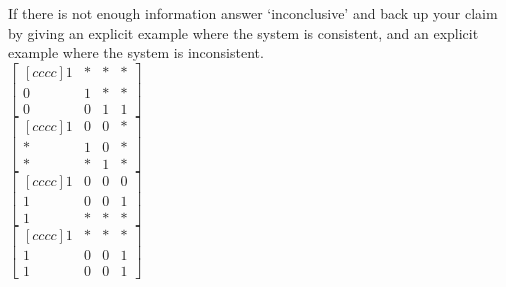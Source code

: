 If there is not enough information answer `inconclusive' and back up your claim by giving an explicit example where the system is consistent, and an explicit example where the system is inconsistent. 
\vspace{.1in}
\\
\bb
\ii $\begin{bmatrix}[cccc]
1&*&*&*\\
0&1&*&*\\
0&0&1&1
\end{bmatrix}
$
\vspace{.1in}
\\
\ii $\begin{bmatrix}[cccc]
1&0&0&*\\
*&1&0&*\\
*&*&1&*
\end{bmatrix}
$
\vspace{.1in}
\\
\ii $\begin{bmatrix}[cccc]
1&0&0&0\\
1&0&0&1\\
1&*&*&*
\end{bmatrix}
$
\vspace{.1in}
\\
\ii $\begin{bmatrix}[cccc]
1&*&*&*\\
1&0&0&1\\
1&0&0&1
\end{bmatrix}
$


